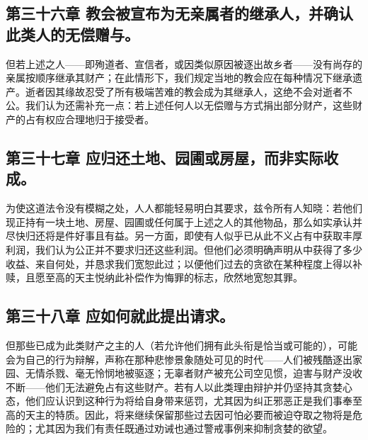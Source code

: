 
\subsection{第三十六章 教会被宣布为无亲属者的继承人，并确认此类人的无偿赠与。}

但若上述之人——即殉道者、宣信者，或因类似原因被逐出故乡者——没有尚存的亲属按顺序继承其财产；在此情形下，我们规定当地的教会应在每种情况下继承遗产。逝者因其缘故忍受了所有极端苦难的教会成为其继承人，这绝不会对逝者不公。我们认为还需补充一点：若上述任何人以无偿赠与方式捐出部分财产，这些财产的占有权应合理地归于接受者。\par


\subsection{第三十七章 应归还土地、园圃或房屋，而非实际收成。}

为使这道法令没有模糊之处，人人都能轻易明白其要求，兹令所有人知晓：若他们现正持有一块土地、房屋、园圃或任何属于上述之人的其他物品，那么如实承认并尽快归还将是件好事且有益。另一方面，即使有人似乎已从此不义占有中获取丰厚利润，我们认为公正并不要求归还这些利润。但他们必须明确声明从中获得了多少收益、来自何处，并恳求我们宽恕此过；以便他们过去的贪欲在某种程度上得以补赎，且愿至高的天主悦纳此补偿作为悔罪的标志，欣然地宽恕其罪。\par


\subsection{第三十八章 应如何就此提出请求。}

但那些已成为此类财产之主的人（若允许他们拥有此头衔是恰当或可能的），可能会为自己的行为辩解，声称在那种悲惨景象随处可见的时代——人们被残酷逐出家园、无情杀戮、毫无怜悯地被驱逐；无辜者财产被充公司空见惯，迫害与财产没收不断——他们无法避免占有这些财产。若有人以此类理由辩护并仍坚持其贪婪心态，他们应认识到这种行为将给自身带来惩罚，尤其因为纠正邪恶正是我们事奉至高的天主的特质。因此，将来继续保留那些过去因可怕必要而被迫夺取之物将是危险的；尤其因为我们有责任既通过劝诫也通过警戒事例来抑制贪婪的欲望。\par

